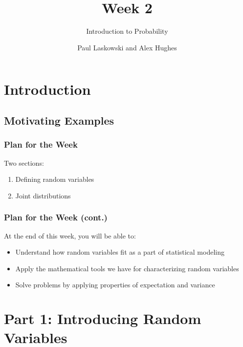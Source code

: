 \documentclass[12pt, block=fill]{beamer}
\title{Week 2}
\subtitle{Introduction to Probability}
\author{Paul Laskowski and Alex Hughes}
\institute{UC Berkeley, School of Information}
\begin{document}
\section{Introduction}
\subsection{Motivating Examples}

\begin{frame}
  \frametitle{Plan for the Week}
  Two sections:
  \begin{enumerate}
  \item Defining random variables
  \item Joint distributions
  \end{enumerate}

    
      
\end{frame}

\begin{frame}
  \frametitle{Plan for the Week (cont.)}
  At the end of this week, you will be able to:
  \begin{itemize}
  \item Understand how random variables fit as a part of statistical
    modeling
  \item Apply the mathematical tools we have for characterizing random
    variables
  \item Solve problems by applying properties of expectation and
    variance
  \end{itemize}
\end{frame}

\section{Part 1: Introducing Random Variables}
\end{document}
